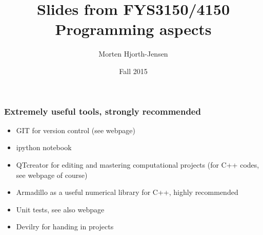 \documentclass{beamer}
\newenvironment{block_mdfboxadmon}[1][]{\begin{block}{#1}}{\end{block}}
\begin{document}




\title{Slides from FYS3150/4150 Programming aspects}


\author{Morten Hjorth-Jensen}

\date{Fall 2015
}

\begin{frame}
\titlepage
\end{frame}

\begin{frame}
\frametitle{Extremely useful tools, strongly recommended}

\begin{block_mdfboxadmon}
\begin{itemize}
  \item GIT for version control (see webpage)

  \item ipython notebook

  \item QTcreator for editing and mastering computational projects (for C++ codes, see webpage of course)

  \item Armadillo as a useful numerical library for C++, highly recommended

  \item Unit tests, see also webpage

  \item Devilry for handing in projects
\end{itemize}

\noindent
\end{block_mdfboxadmon}
\end{frame}
\end{document}
